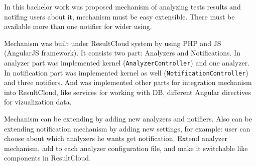 In this bachelor work was proposed mechanism of analyzing tests results and notifing users about it, mechanism must be easy extensible. There must be available more than one notifier for wider using.

Mechanism was built under ResultCloud system by using PHP and JS (AngularJS framework). It consists two part: Analyzers and Notifications. In analyzer part was implemented kernel (\texttt{AnalyzerController}) and one analyzer. In notification part was implemented kernel as well (\texttt{NotificationController}) and three notifiers. And was implemented other parts for integration mechanism into ResultCloud, like services for working with DB, different Angular directives for vizualization data.

Mechanism can be extending by adding new analyzers and notifiers. Also can be extending notification mechanism by adding new settings, for example: user can choose about which analyzers he wants get notification. Extend analyzer mechanism, add to each analyzer configuration file, and make it switchable like components in ResultCloud.


